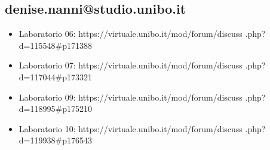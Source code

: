 \documentclass{article}
\begin{document}
\subsection{denise.nanni@studio.unibo.it}
\begin{itemize}
\item Laboratorio 06: https://virtuale.unibo.it/mod/forum/discuss
.php?d=115548\#p171388
\item Laboratorio 07: https://virtuale.unibo.it/mod/forum/discuss
.php?d=117044\#p173321
\item Laboratorio 09: https://virtuale.unibo.it/mod/forum/discuss
.php?d=118995\#p175210
\item Laboratorio 10: https://virtuale.unibo.it/mod/forum/discuss
.php?d=119938\#p176543
\end{itemize}
\end{document}
